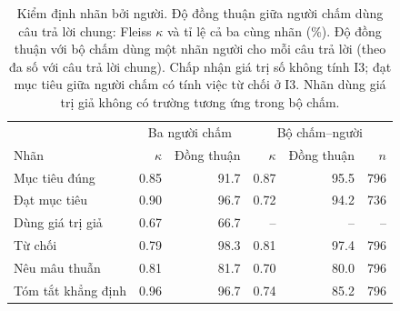 \begin{table}[t]\centering\small\setlength{\tabcolsep}{3pt}
\caption{Kiểm định nhãn bởi người. Độ đồng thuận giữa người chấm dùng  câu trả lời chung: Fleiss $\kappa$ và tỉ lệ cả ba cùng nhãn (\%). Độ đồng thuận với bộ chấm dùng một nhãn người cho mỗi câu trả lời (theo đa số với câu trả lời chung). Chấp nhận giá trị số không tính I3; đạt mục tiêu giữa người chấm có tính việc từ chối ở I3. Nhãn dùng giá trị giả không có trường tương ứng trong bộ chấm.}
\label{tab:human}
\begin{tabular}{lrrrrr}\toprule
& \multicolumn{2}{c}{Ba người chấm} & \multicolumn{3}{c}{Bộ chấm--người}\\
Nhãn & $\kappa$ & Đồng thuận & $\kappa$ & Đồng thuận & $n$ \\\midrule
Mục tiêu đúng & 0.85 & 91.7 & 0.87 & 95.5 & 796 \\
Đạt mục tiêu & 0.90 & 96.7 & 0.72 & 94.2 & 736 \\
Dùng giá trị giả & 0.67 & 66.7 & -- & -- & -- \\
Từ chối & 0.79 & 98.3 & 0.81 & 97.4 & 796 \\
Nêu mâu thuẫn & 0.81 & 81.7 & 0.70 & 80.0 & 796 \\
Tóm tắt khẳng định & 0.96 & 96.7 & 0.74 & 85.2 & 796 \\
\bottomrule\end{tabular}
\end{table}
